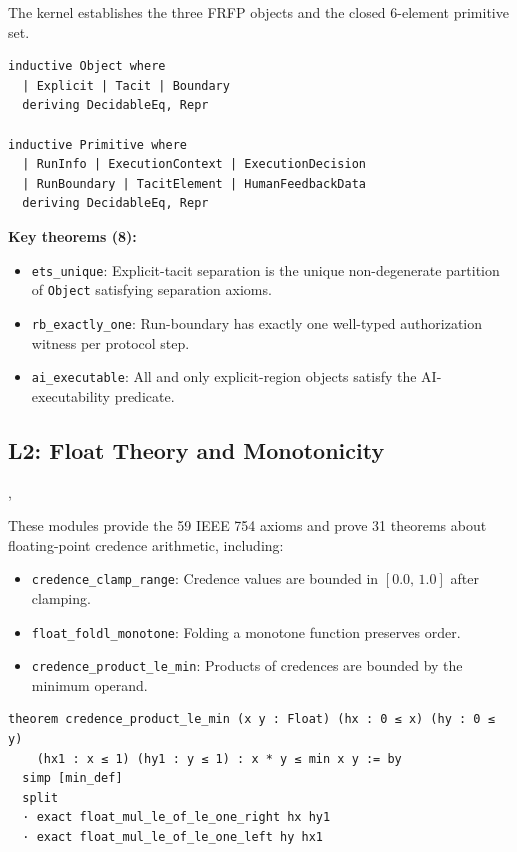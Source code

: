 
The kernel establishes the three FRFP objects and the closed 6-element primitive
set.

\begin{lstlisting}
inductive Object where
  | Explicit | Tacit | Boundary
  deriving DecidableEq, Repr

inductive Primitive where
  | RunInfo | ExecutionContext | ExecutionDecision
  | RunBoundary | TacitElement | HumanFeedbackData
  deriving DecidableEq, Repr
\end{lstlisting}

\textbf{Key theorems (8):}
\begin{itemize}
  \item \texttt{ets\_unique}: Explicit-tacit separation is the unique non-degenerate
        partition of \texttt{Object} satisfying separation axioms.
  \item \texttt{rb\_exactly\_one}: Run-boundary has exactly one well-typed
        authorization witness per protocol step.
  \item \texttt{ai\_executable}: All and only explicit-region objects satisfy the
        AI-executability predicate.
\end{itemize}

\subsection{L2: Float Theory and Monotonicity}

, 

These modules provide the 59 IEEE 754 axioms and prove 31 theorems about
floating-point credence arithmetic, including:

\begin{itemize}
  \item \texttt{credence\_clamp\_range}: Credence values are bounded in $[0.0,\,1.0]$
        after clamping.
  \item \texttt{float\_foldl\_monotone}: Folding a monotone function preserves
        order.
  \item \texttt{credence\_product\_le\_min}: Products of credences are bounded by
        the minimum operand.
\end{itemize}

\begin{lstlisting}
theorem credence_product_le_min (x y : Float) (hx : 0 ≤ x) (hy : 0 ≤ y)
    (hx1 : x ≤ 1) (hy1 : y ≤ 1) : x * y ≤ min x y := by
  simp [min_def]
  split
  · exact float_mul_le_of_le_one_right hx hy1
  · exact float_mul_le_of_le_one_left hy hx1
\end{lstlisting}

